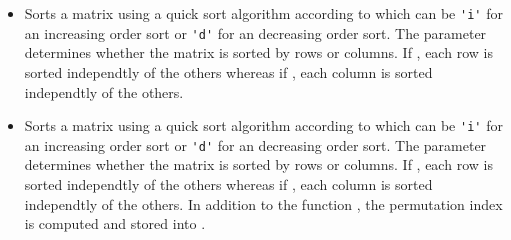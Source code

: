 \begin{itemize}
\item {}
  \sshortdescribe Sorts a matrix using a quick sort algorithm according to
   which can be \verb!'i'! for an increasing order sort or
  \verb!'d'! for an decreasing order sort. The parameter  determines
  whether the matrix is sorted by rows or columns. If , each row
  is sorted independtly of the others whereas if , each column
  is sorted independtly of the others.

\item {}
  \sshortdescribe Sorts a matrix using a quick sort algorithm according to
   which can be \verb!'i'! for an increasing order sort or
  \verb!'d'! for an decreasing order sort. The parameter  determines
  whether the matrix is sorted by rows or columns. If , each row
  is sorted independtly of the others whereas if , each column
  is sorted independtly of the others. In addition to the function
  , the permutation index is computed and stored into 
  .
\end{itemize}


